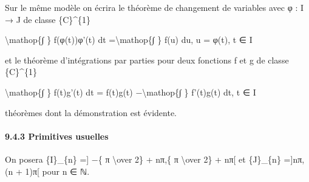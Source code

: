 \documentclass[]{article}
\begin{document}
Sur le même modèle on écrira le théorème de changement de variables avec
φ : I → J de classe \{C\}\^{}\{1\}

\textbackslash{}mathop\{∫ \} f(φ(t))φ'(t) dt =\textbackslash{}mathop\{∫
\} f(u) du, u = φ(t), t ∈ I

et le théorème d'intégrations par parties pour deux fonctions f et g de
classe \{C\}\^{}\{1\}

\textbackslash{}mathop\{∫ \} f(t)g'(t) dt = f(t)g(t)
−\textbackslash{}mathop\{∫ \} f'(t)g(t) dt, t ∈ I

théorèmes dont la démonstration est évidente.

\paragraph{9.4.3 Primitives usuelles}

On posera \{I\}\_\{n\} ={]} −\{ π \textbackslash{}over 2\} + nπ,\{ π
\textbackslash{}over 2\} + nπ{[} et \{J\}\_\{n\} ={]}nπ,(n + 1)π{[} pour
n ∈ ℕ.
\end{document}
